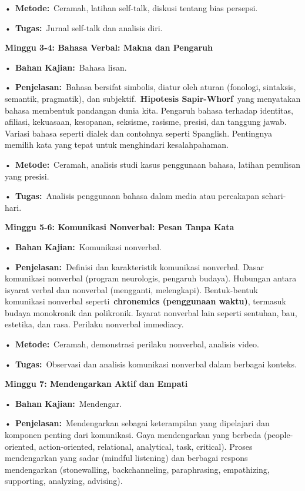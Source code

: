 \documentclass[
  letterpaper,
  DIV=11,
  numbers=noendperiod]{scrreprt}
\begin{document}
•~\textbf{Metode:}~Ceramah, latihan self-talk, diskusi tentang bias
persepsi.

•~\textbf{Tugas:}~Jurnal self-talk dan analisis diri.

\textbf{Minggu 3-4: Bahasa Verbal: Makna dan Pengaruh}

•~\textbf{Bahan Kajian:}~Bahasa lisan.

•~\textbf{Penjelasan:}~Bahasa bersifat simbolis, diatur oleh aturan
(fonologi, sintaksis, semantik, pragmatik), dan
subjektif.~\textbf{Hipotesis Sapir-Whorf}~yang menyatakan bahasa
membentuk pandangan dunia kita. Pengaruh bahasa terhadap identitas,
afiliasi, kekuasaan, kesopanan, seksisme, rasisme, presisi, dan tanggung
jawab. Variasi bahasa seperti dialek dan contohnya seperti Spanglish.
Pentingnya memilih kata yang tepat untuk menghindari kesalahpahaman.

•~\textbf{Metode:}~Ceramah, analisis studi kasus penggunaan bahasa,
latihan penulisan yang presisi.

•~\textbf{Tugas:}~Analisis penggunaan bahasa dalam media atau percakapan
sehari-hari.

\textbf{Minggu 5-6: Komunikasi Nonverbal: Pesan Tanpa Kata}

•~\textbf{Bahan Kajian:}~Komunikasi nonverbal.

•~\textbf{Penjelasan:}~Definisi dan karakteristik komunikasi nonverbal.
Dasar komunikasi nonverbal (program neurologis, pengaruh budaya).
Hubungan antara isyarat verbal dan nonverbal (mengganti, melengkapi).
Bentuk-bentuk komunikasi nonverbal seperti~\textbf{chronemics
(penggunaan waktu)}, termasuk budaya monokronik dan polikronik. Isyarat
nonverbal lain seperti sentuhan, bau, estetika, dan rasa. Perilaku
nonverbal immediacy.

•~\textbf{Metode:}~Ceramah, demonstrasi perilaku nonverbal, analisis
video.

•~\textbf{Tugas:}~Observasi dan analisis komunikasi nonverbal dalam
berbagai konteks.

\textbf{Minggu 7: Mendengarkan Aktif dan Empati}

•~\textbf{Bahan Kajian:}~Mendengar.

•~\textbf{Penjelasan:}~Mendengarkan sebagai keterampilan yang dipelajari
dan komponen penting dari komunikasi. Gaya mendengarkan yang berbeda
(people-oriented, action-oriented, relational, analytical, task,
critical). Proses mendengarkan yang sadar (mindful listening) dan
berbagai respons mendengarkan (stonewalling, backchanneling,
paraphrasing, empathizing, supporting, analyzing, advising).
\end{document}

